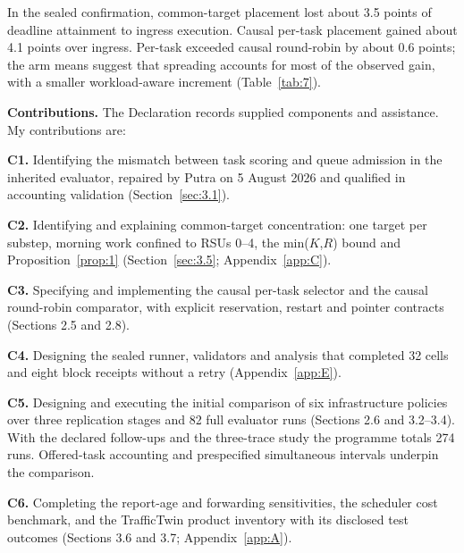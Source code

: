 \documentclass[12pt,a4paper]{article}
\begin{document}
In the sealed confirmation, common-target placement lost about 3.5 points of deadline attainment to ingress execution. Causal per-task placement gained about 4.1 points over ingress. Per-task exceeded causal round-robin by about 0.6 points; the arm means suggest that spreading accounts for most of the observed gain, with a smaller workload-aware increment (Table~\ref{tab:7}).

\textbf{Contributions.} The Declaration records supplied components and assistance. My contributions are:

\textbf{C1.} Identifying the mismatch between task scoring and queue admission in the inherited evaluator, repaired by Putra on 5 August 2026 and qualified in accounting validation (Section~\ref{sec:3.1}).

\textbf{C2.} Identifying and explaining common-target concentration: one target per substep, morning work confined to RSUs 0--4, the min($K$,$R$) bound and Proposition~\ref{prop:1} (Section~\ref{sec:3.5}; Appendix~\ref{app:C}).

\textbf{C3.} Specifying and implementing the causal per-task selector and the causal round-robin comparator, with explicit reservation, restart and pointer contracts (Sections 2.5 and 2.8).

\textbf{C4.} Designing the sealed runner, validators and analysis that completed 32 cells and eight block receipts without a retry (Appendix~\ref{app:E}).

\textbf{C5.} Designing and executing the initial comparison of six infrastructure policies over three replication stages and 82 full evaluator runs (Sections 2.6 and 3.2--3.4). With the declared follow-ups and the three-trace study the programme totals 274 runs. Offered-task accounting and prespecified simultaneous intervals underpin the comparison.

\textbf{C6.} Completing the report-age and forwarding sensitivities, the scheduler cost benchmark, and the TrafficTwin product inventory with its disclosed test outcomes (Sections 3.6 and 3.7; Appendix~\ref{app:A}).

\FloatBarrier
\end{document}
